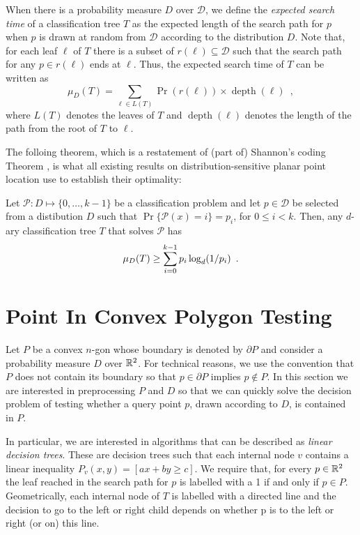 \documentclass[charterfonts,lotsofwhite]{patmorin}
\newcommand{\boundary}{\partial}
\DeclareMathOperator{\depth}{depth}
\begin{document}
When there is a probability measure $D$ over $\mathcal{D}$, we define
the \emph{expected search time} of a classification tree $T$ as the
expected length of the search path for $p$ when $p$ is drawn at random
from $\mathcal{D}$ according to the distribution $D$.  Note that, for
each leaf $\ell$ of $T$ there is a subset of $r(\ell)\subseteq
\mathcal{D}$ such that the search path for any $p\in r(\ell)$ ends at
$\ell$.  Thus, the expected search time of $T$ can be written as
\[
     \mu_D(T) = \sum_{\ell\in L(T)} \Pr(r(\ell))\times \depth(\ell)
	\enspace ,
\]
where $L(T)$ denotes the leaves of $T$ and $\depth(\ell)$ denotes the
length of the path from the root of $T$ to $\ell$.

The folloing theorem, which is a restatement of (part of) Shannon's
coding Theorem \cite{sXX}, is what all existing results on
distribution-sensitive planar point location use to establish their
optimality:

\begin{thm}
Let $\mathcal{P}:D\mapsto \{0,\ldots,k-1\}$ be a classification
problem and let $p\in \mathcal{D}$ be selected from a distibution $D$ such
that $\Pr\{\mathcal{P}(x)= i\}=p_i$, for $0\le i< k$.  Then, any
$d$-ary classification tree $T$ that solves $\mathcal{P}$ has
\begin{equation}
     \mu_D(T) \ge \sum_{i=0}^{k-1} p_i\log_d(1/p_i) \enspace .
	\eqlabel{shannon}
\end{equation}
\end{thm}


\section{Point In Convex Polygon Testing}

Let $P$ be a convex $n$-gon whose boundary is denoted by $\partial P$
and consider a probability measure $D$ over $\mathbb{R}^2$.  For technical
reasons, we use the convention that $P$ does not contain its boundary
so that $p\in \boundary P$ implies $p\not\in P$.  In this section we
are interested in preprocessing $P$ and $D$ so that we can quickly
solve the decision problem of testing whether a query point $p$, drawn
according to $D$, is contained in $P$. 

In particular, we are interested in algorithms that can be described
as \emph{linear decision trees}.  These are decision trees such that
each internal node $v$ contains a linear inequality $P_v(x,y)=[ax+by
\ge c]$.  We require that, for every $p\in\mathbb{R}^2$ the leaf reached in
the search path for $p$ is labelled with a 1 if and only if $p\in P$.
Geometrically, each internal node of $T$ is labelled with a directed
line and the decision to go to the left or right child depends on
whether p is to the left or right (or on) this line.  
\end{document}
